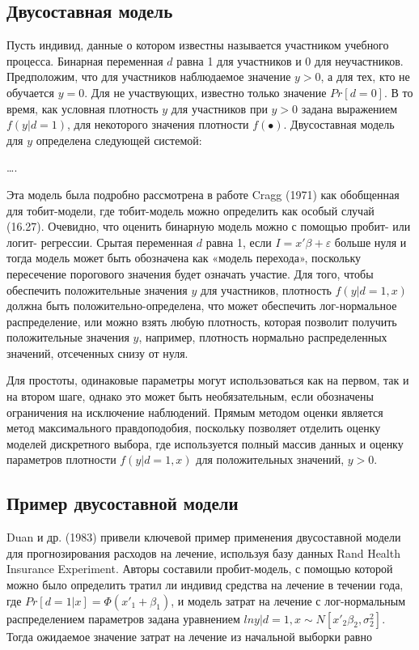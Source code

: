 \subsection{Двусоставная модель}

Пусть индивид, данные о котором известны называется участником учебного процесса. Бинарная переменная $d$ равна 1 для участников и 0 для неучастников. Предположим, что для участников наблюдаемое значение $y>0$, а для тех, кто не обучается $y=0$. Для не участвующих, известно только значение $Pr[d=0]$. В то время, как условная плотность $y$ для участников при $y>0$ задана выражением $f(y|d=1)$, для некоторого значения плотности $f(\bullet)$. Двусоставная модель для $y$ определена следующей системой:

\ldots .

Эта модель была подробно рассмотрена в работе Cragg (1971) как обобщенная для тобит-модели, где тобит-модель можно определить как особый случай (16.27). Очевидно, что оценить бинарную модель можно с помощью пробит- или логит- регрессии. Срытая переменная $d$ равна 1, если $I=x'\beta+\varepsilon$ больше нуля и тогда модель может быть обозначена как «модель перехода», поскольку пересечение порогового значения будет означать участие. Для того, чтобы обеспечить положительные значения $y$ для участников, плотность $f(y|d=1,x)$ должна быть положительно-определена, что может обеспечить лог-нормальное распределение, или можно взять любую плотность, которая позволит получить положительные значения $y$, например, плотность нормально распределенных значений, отсеченных снизу от нуля.

Для простоты, одинаковые параметры могут использоваться как на первом, так и на втором шаге, однако это может быть необязательным, если обозначены ограничения на исключение наблюдений. Прямым методом оценки является метод максимального правдоподобия, поскольку позволяет отделить оценку моделей дискретного выбора, где используется полный массив данных и оценку параметров плотности $f(y|d=1,x)$ для положительных значений, $y>0$.


\subsection{Пример двусоставной модели}


Duan и др. (1983) привели ключевой пример применения двусоставной модели для прогнозирования расходов на лечение, используя базу данных Rand Health Insurance Experiment. Авторы составили пробит-модель, с помощью которой можно было определить тратил ли индивид средства на лечение в течении года, где $Pr[d=1|x]=\Phi(x'_1+\beta_{1})$, и модель затрат на лечение с лог-нормальным распределением параметров задана уравнением $ln{y|d}=1, x{\sim}N[x'_2\beta_{2},\sigma^{2}_{2}]$. Тогда ожидаемое значение затрат на лечение из начальной выборки равно


